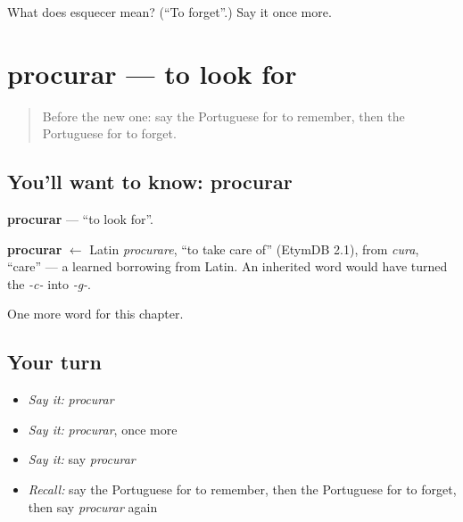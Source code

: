 \begin{tcolorbox}[breakable,colback=teal!4,colframe=teal!35!black,title={Before you move on}]
What does esquecer mean? (\textquotedblleft{}To forget\textquotedblright{}.) Say it once more.
\end{tcolorbox}
\section[procurar]{procurar — to look for}

\label{lesson:PT-C81-procurar}



\begin{quote}
Before the new one: say the Portuguese for to remember, then the Portuguese for to forget.
\end{quote}

\subsection*{You'll want to know: procurar}
\textbf{procurar} — \textquotedblleft{}to look for\textquotedblright{}.

\begin{cousinweb}
\textbf{procurar} $\leftarrow$ Latin \emph{procurare}, \textquotedblleft{}to take care of\textquotedblright{} (EtymDB 2.1), from \emph{cura}, \textquotedblleft{}care\textquotedblright{} — a learned borrowing from Latin. An inherited word would have turned the \emph{-c-} into \emph{-g-}.
\end{cousinweb}

\begin{grammarlens}[title={What you've built}]
One more word for this chapter.
\end{grammarlens}

\subsection*{Your turn}
\begin{itemize}
\raggedright
  \item \emph{Say it:} \emph{procurar}
  \item \emph{Say it:} \emph{procurar}, once more
  \item \emph{Say it:} say \emph{procurar}
  \item \emph{Recall:} say the Portuguese for to remember, then the Portuguese for to forget, then say \emph{procurar} again
\end{itemize}

